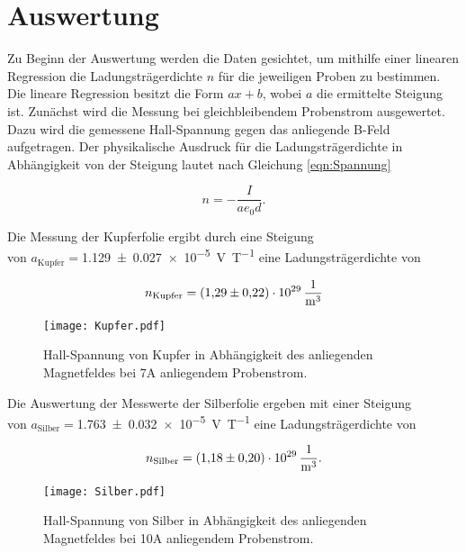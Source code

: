 %

%
\section{Auswertung}
\label{sec:Auswertung}

\noindent Zu Beginn der Auswertung werden die Daten gesichtet, um mithilfe einer linearen Regression 
die Ladungsträgerdichte $n$ für die jeweiligen Proben zu bestimmen. Die lineare Regression besitzt die Form $ax+b$, wobei $a$ 
die ermittelte Steigung ist. 
Zunächst wird die Messung bei gleichbleibendem Probenstrom ausgewertet. 
Dazu wird die gemessene Hall-Spannung gegen das anliegende B-Feld aufgetragen. 
Der physikalische Ausdruck für die Ladungsträgerdichte in Abhängigkeit von der Steigung lautet nach 
Gleichung \eqref{eqn:Spannung} 

\begin{equation*}
    n = - \frac{I}{a e_0 d}.
\end{equation*}

\noindent Die Messung der Kupferfolie ergibt durch eine Steigung \\ 
von $a_\text{Kupfer}=$\qty{1.129\pm 0.027e-5}{\volt\per\tesla} eine Ladungsträgerdichte von 

\begin{equation*}
    n_\text{Kupfer} = \qty{1.29\pm0.22e29}{\per\cubic\meter}
\end{equation*}

\begin{figure}[H]
    \centering
    \label{Kupfer}
    \texttt{[image: Kupfer.pdf]}
    \caption{Hall-Spannung von Kupfer in Abhängigkeit des anliegenden Magnetfeldes bei 7A anliegendem Probenstrom.}
\end{figure}

\noindent Die Auswertung der Messwerte der Silberfolie ergeben mit einer Steigung \\
von $a_\text{Silber}=$\qty{1.763\pm 0.032e-5}{\volt\per\tesla} eine Ladungsträgerdichte von 

\begin{equation*}
    n_\text{Silber} = \qty{1.18\pm0.2e29}{\per\cubic\meter}.
\end{equation*}

\begin{figure}[H]
    \centering
    \label{Silber}
    \texttt{[image: Silber.pdf]}
    \caption{Hall-Spannung von Silber in Abhängigkeit des anliegenden Magnetfeldes bei 10A anliegendem Probenstrom.}
\end{figure}

